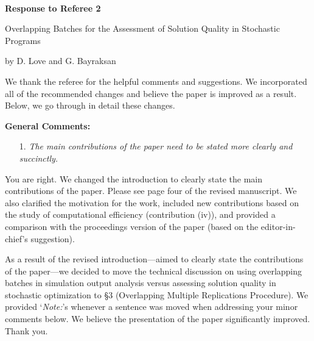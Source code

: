 \documentclass[11pt,notitlepage,onecolumn]{article}
\newcommand{\noi}{\noindent}
\begin{document}

\singlespacing

\baselineskip0.26in


\pagebreak

\
\begin{center}
\textbf{\Large Response to Referee 2} 
\medskip

{\large Overlapping Batches for the Assessment of Solution Quality in Stochastic Programs}
\medskip

{\footnotesize by D. Love and G. Bayraksan}
\end{center}

\bigskip


\noi 
We thank the referee for the helpful comments and suggestions. 
We incorporated all of the recommended changes and believe the paper is improved as a result. 
Below, we go through in detail these changes. 
\medskip

\bigskip 


\noi  
{\large \bf General Comments:}
\medskip 


\begin{itemize}
\item[1.] \textit{The main contributions of the paper need to be stated more clearly and succinctly.}
\end{itemize}

\noindent 
You are right. 
We changed the introduction to clearly state the main contributions of the paper.  
Please see page four of the revised manuscript. 
We also clarified the motivation for the work, included new contributions based on the study of computational efficiency (contribution (iv)), and provided a comparison with the proceedings version of the paper (based on the editor-in-chief's suggestion).
\medskip 

\noi 
As a result of the revised introduction---aimed to clearly state the contributions of the paper---we decided to move the technical discussion on using overlapping batches in simulation output analysis versus assessing solution quality in stochastic optimization to \S 3 (Overlapping Multiple Replications Procedure).
We provided `{\it Note:}'s whenever a sentence was moved when addressing your minor comments below. 
We believe the presentation of the paper significantly improved.  
Thank you.
\medskip 
\end{document}
